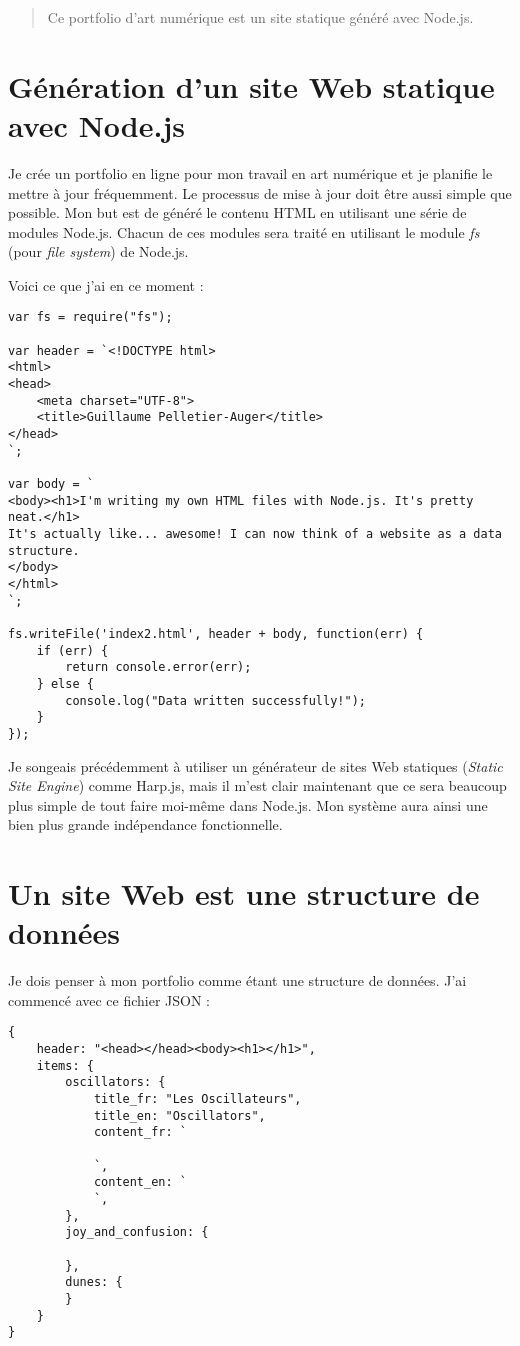 
\begin{abstract}
Ce portfolio d'art numérique est un site statique généré avec Node.js.
\end{abstract}

\section{Génération d'un site Web statique avec Node.js}
Je crée un portfolio en ligne pour mon travail en art numérique et je planifie le mettre à jour fréquemment. Le processus de mise à jour doit être aussi simple que possible. Mon but est de généré le contenu HTML en utilisant une série de modules Node.js. Chacun de ces modules sera traité en utilisant le module \textit{fs} (pour \textit{file system}) de Node.js.

Voici ce que j'ai en ce moment :

\begin{lstlisting}
var fs = require("fs");

var header = `<!DOCTYPE html>
<html>
<head>
    <meta charset="UTF-8">
    <title>Guillaume Pelletier-Auger</title>
</head>
`;

var body = `
<body><h1>I'm writing my own HTML files with Node.js. It's pretty neat.</h1>
It's actually like... awesome! I can now think of a website as a data structure.
</body>
</html>
`;

fs.writeFile('index2.html', header + body, function(err) {
    if (err) {
        return console.error(err);
    } else {
        console.log("Data written successfully!");
    }
});

\end{lstlisting}

Je songeais précédemment à utiliser un générateur de sites Web statiques (\textit{Static Site Engine}) comme Harp.js, mais il m'est clair maintenant que ce sera beaucoup plus simple de tout faire moi-même dans Node.js. Mon système aura ainsi une bien plus grande indépendance fonctionnelle.

\section{Un site Web est une structure de données}
Je dois penser à mon portfolio comme étant une structure de données.
J'ai commencé avec ce fichier JSON :
\begin{lstlisting}
{
    header: "<head></head><body><h1></h1>",
    items: {
        oscillators: {
            title_fr: "Les Oscillateurs",
            title_en: "Oscillators",
            content_fr: `
            
            `,
            content_en: `
            `,
        },
        joy_and_confusion: {

        },
        dunes: {
        }
    }
}
\end{lstlisting}

